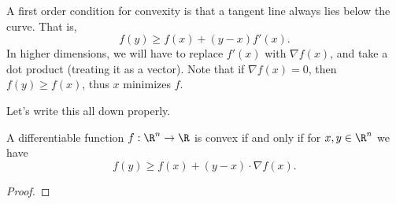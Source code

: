 \documentclass[a4paper]{scrartcl}
\begin{document}
A first order condition for convexity is that a tangent line always lies below the curve. That is,
$$
f(y) \geq f(x) + (y - x) f'(x).
$$
In higher dimensions, we will have to replace $f'(x)$ with $\nabla f(x)$, and take a dot product (treating it as a vector). 
Note that if $\nabla f(x) = 0$, then $f(y) \geq f(x)$, thus $x$ minimizes $f$.

Let's write this all down properly.



\begin{theorem}
	A differentiable function $f: \R^n \rightarrow \R$ is convex if and only if for $x, y \in \R^n$ we have
	$$
f(y) \geq f(x) + (y - x) \cdot \nabla f(x).
	$$
\end{theorem}
\begin{proof}
	
\end{proof}
\end{document}

